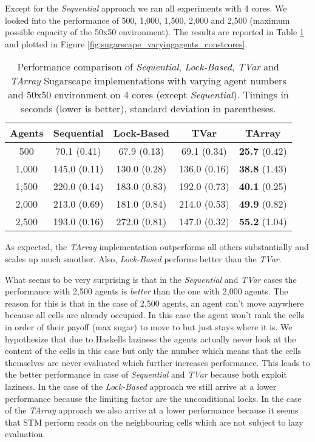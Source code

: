 Except for the \textit{Sequential} approach we ran all experiments with 4 cores. We looked into the performance of 500, 1,000, 1,500, 2,000 and 2,500 (maximum possible capacity of the 50x50 environment). The results are reported in Table \ref{tab:sugarscape_varyingagents_constcores} and plotted in Figure \ref{fig:sugarscape_varyingagents_constcores}.

\begin{table}
	\centering
  	\begin{tabular}{ c || c | c | c | c }
        Agents  & Sequential    & Lock-Based    & TVar          & TArray                \\ \hline \hline 
    	    500     & 70.1 (0.41)   & 67.9 (0.13)   & 69.1 (0.34)   & \textbf{25.7} (0.42)  \\ \hline
   		1,000   & 145.0 (0.11)  & 130.0 (0.28)  & 136.0 (0.16)  & \textbf{38.8} (1.43)  \\ \hline
   		1,500   & 220.0 (0.14)  & 183.0 (0.83)  & 192.0 (0.73)  & \textbf{40.1} (0.25)  \\ \hline
   		2,000   & 213.0 (0.69)  & 181.0 (0.84)  & 214.0 (0.53)  & \textbf{49.9} (0.82)  \\ \hline
   		2,500   & 193.0 (0.16)  & 272.0 (0.81)  & 147.0 (0.32)  & \textbf{55.2} (1.04)  \\ \hline \hline
   	\end{tabular}
  	
  	\caption{Performance comparison of \textit{Sequential}, \textit{Lock-Based}, \textit{TVar} and \textit{TArray} Sugarscape implementations with varying agent numbers and 50x50 environment on 4 cores (except \textit{Sequential}). Timings in seconds (lower is better), standard deviation in parentheses.}
	\label{tab:sugarscape_varyingagents_constcores}
\end{table}

As expected, the \textit{TArray} implementation outperforms all others substantially and scales up much smother. Also, \textit{Lock-Based} performs better than the \textit{TVar}.

What seems to be very surprising is that in the \textit{Sequential} and \textit{TVar} cases the performance with 2,500 agents is \textit{better} than the one with 2,000 agents. The reason for this is that in the case of 2,500 agents, an agent can't move anywhere because all cells are already occupied. In this case the agent won't rank the cells in order of their payoff (max sugar) to move to but just stays where it is. We hypothesize that due to Haskells laziness the agents actually never look at the content of the cells in this case but only the number which means that the cells themselves are never evaluated which further increases performance. This leads to the better performance in case of \textit{Sequential} and \textit{TVar} because both exploit laziness. 
In the case of the \textit{Lock-Based} approach we still arrive at a lower performance because the limiting factor are the unconditional locks. In the case of the \textit{TArray} approach we also arrive at a lower performance because it seems that STM perform reads on the neighbouring cells which are not subject to lazy evaluation.

